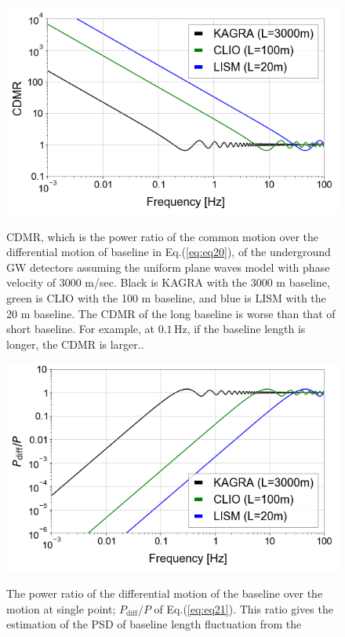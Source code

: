 \begin{figure}[p]
  \begin{center}
    \centering
    \includegraphics[width=12cm]{./img_chap3/img329.png}
    \caption[CDMR, which is the power ratio of the common motion over the differential motion of baseline in Eq.(\ref{eq:eq20}), of the underground GW detectors assuming the uniform plane waves model with phase velocity of 3000 m/sec.]{CDMR, which is the power ratio of the common motion over the differential motion of baseline in Eq.(\ref{eq:eq20}), of the underground GW detectors assuming the uniform plane waves model with phase velocity of 3000 m/sec. Black is KAGRA with the 3000 m baseline, green is CLIO with the 100 m baseline, and blue is LISM with the 20 m baseline. The CDMR of the long baseline is worse than that of short baseline. For example, at $0.1\,\mathrm{Hz}$, if the baseline length is longer, the CDMR is larger..}\label{img:img301}
    \centering      
    \includegraphics[width=12cm]{./img_chap3/img328.png}
    \caption[The power ratio of the differential motion of the baseline over the motion at single point; $P_{\mathrm{diff}}/P$ of Eq.(\ref{eq:eq21})]{The power ratio of the differential motion of the baseline over the motion at single point; $P_{\mathrm{diff}}/P$ of Eq.(\ref{eq:eq21}). This ratio gives the estimation of the PSD of baseline length fluctuation from the }\label{img:img302}
  \end{center}
\end{figure}



